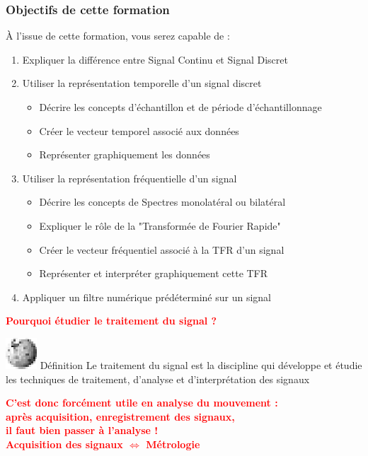 \documentclass[a4paper,11pt]{beamer}
\begin{document}
\begin{frame}[plain]
\frametitle{Objectifs de cette formation}
\center
À l'issue de cette formation, vous serez capable de :
    \vspace{0.25cm}

\begin{enumerate}
    \item Expliquer la différence entre Signal Continu et Signal Discret
    \item Utiliser la représentation temporelle d'un signal discret
 		\begin{itemize}
 		  \item Décrire les concepts d'échantillon et de période d'échantillonnage
 		  \item Créer le vecteur temporel associé aux données
 		  \item Représenter graphiquement les données
 		\end{itemize}
  \item Utiliser la représentation fréquentielle d'un signal
  	    \begin{itemize}
  	      \item Décrire les concepts de Spectres monolatéral ou bilatéral
  	      \item Expliquer le rôle de la "Transformée de Fourier Rapide"
  	      \item Créer le vecteur fréquentiel associé à la TFR d'un signal
 		  \item Représenter et interpréter graphiquement cette TFR
 		\end{itemize}
 \item Appliquer un filtre numérique prédéterminé sur un signal
\end{enumerate}
\end{frame}

\begin{frame}
	\begin{center}
		\textbf{\textcolor{red}{Pourquoi étudier le traitement du signal ?}}
	\end{center}
	\pause
	\begin{block}{\includegraphics[scale=0.45]{images/Logo_Wikipedia.eps}
	\enspace Définition} Le traitement du signal est la discipline qui développe et
	étudie les techniques de traitement, d'analyse et d'interprétation des signaux
	\end{block}
	\pause
	\begin{center}
		\textbf{\textcolor{red}{C'est donc forcément utile en analyse du mouvement :
		\\
		\smallbreak 
		après acquisition, enregistrement des signaux,\\ il faut bien
		passer à l'analyse !\\
		\bigbreak
		 Acquisition des signaux $\Leftrightarrow$ Métrologie}}
	\end{center}
\end{frame}
\end{document}
